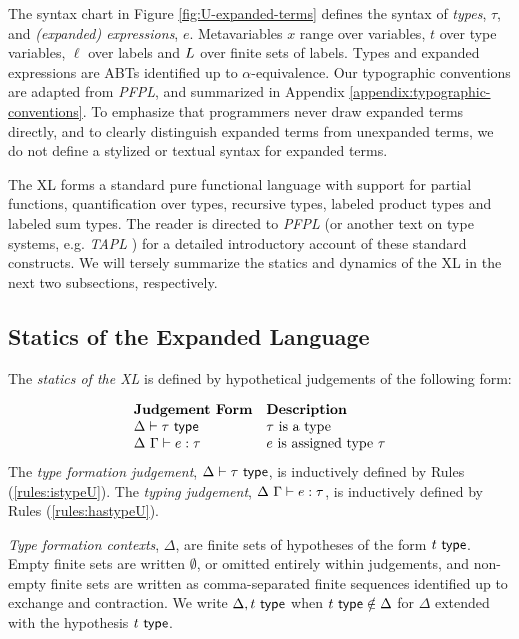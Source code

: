 \noindent The syntax chart in Figure \ref{fig:U-expanded-terms} defines the syntax of \emph{types}, $\tau$, and \emph{(expanded) expressions}, $e$. Metavariables $x$ range over variables, $t$ over type variables, $\ell$ over labels and $L$ over finite sets of labels. Types and expanded expressions are ABTs identified up to $\alpha$-equivalence. Our typographic conventions are adapted from \emph{PFPL}, and summarized in Appendix \ref{appendix:typographic-conventions}. To emphasize that programmers never draw expanded terms directly, and to clearly distinguish expanded terms from unexpanded terms, we do not define a stylized or textual syntax for expanded terms.

The {XL} forms a standard pure functional language with support for partial functions, quantification over types, recursive types, labeled product types and labeled sum types.  The reader is directed to \emph{PFPL} \cite{pfpl} (or another text on type systems, e.g. \emph{TAPL} \cite{tapl}) for a detailed introductory account of these standard constructs. We will tersely summarize the statics and dynamics of the XL in the next two subsections, respectively.


\subsection{Statics of the Expanded Language}
The \emph{statics of the XL} is defined by hypothetical judgements of the following form:

\[\begin{array}{ll}
\textbf{Judgement Form} & \textbf{Description}\\
\Delta \vdash \tau~\mathsf{type} & \text{$\tau$ is a type}\\
\Delta~\Gamma \vdash e : \tau & \text{$e$ is assigned type $\tau$}
\end{array}\]
The \emph{type formation judgement}, $\Delta \vdash \tau~\mathsf{type}$, is inductively defined by Rules (\ref{rules:istypeU}). The \emph{typing judgement}, $\Delta~\Gamma \vdash e : \tau$, is inductively defined by Rules (\ref{rules:hastypeU}).

\emph{Type formation contexts}, $\Delta$, are finite sets of hypotheses of the form $t~\mathsf{type}$. Empty finite sets are written $\emptyset$, or omitted entirely within judgements, and non-empty finite sets are written as comma-separated finite sequences identified up to exchange and contraction. We write $\Delta, t~\mathsf{type}$ when $t~\mathsf{type} \notin \Delta$ for $\Delta$ extended with the hypothesis $t~\mathsf{type}$. %

